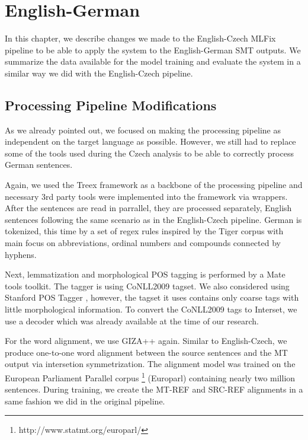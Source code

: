 \chapter{English-German}
\label{chap:german}

In this chapter, we describe changes we made to the English-Czech MLFix pipeline
to be able to apply the system to the English-German
SMT outputs. We summarize the data available for the model training
and evaluate the system in a similar way we did with the English-Czech
pipeline.

\section{Processing Pipeline Modifications}

As we already pointed out, we focused on making the processing pipeline as independent
on the target language as possible. However, we still had to replace some of the tools
used during the Czech analysis to be able to correctly process German sentences.

Again, we used the Treex framework as a backbone of the processing pipeline and
necessary 3rd party tools were implemented into the framework via wrappers.
After the sentences are read in parrallel, they are processed separately, English sentences
following the same scenario as in the English-Czech pipeline.
German is tokenized, this time by a set of regex rules inspired by the Tiger corpus \citep{Brants2004}
with main focus on abbreviations, ordinal numbers and compounds connected by hyphens.

Next, lemmatization and morphological POS tagging is performed by a Mate tools
toolkit. The tagger is using CoNLL2009 \citep{CoNLL-2009-ST} tagset. We also considered using
Stanford POS Tagger \citep{Toutanova:2000:EKS:1117794.1117802},
however, the tagset it uses contains only coarse tags with little morphological information.
To convert the CoNLL2009 tags to Interset, we use a decoder which was already available at the
time of our research.

For the word alignment, we use GIZA++ again. Similar to English-Czech, we produce one-to-one word
alignment between the source sentences and the MT output
via intersetion symmetrization. The alignment model was trained on the European
Parliament Parallel corpus \citep{koehn2005epc}\footnote{http://www.statmt.org/europarl/} (Europarl)
containing nearly two million sentences. 
During training, we create the MT-REF and SRC-REF alignments in a same fashion we did in the original
pipeline.

